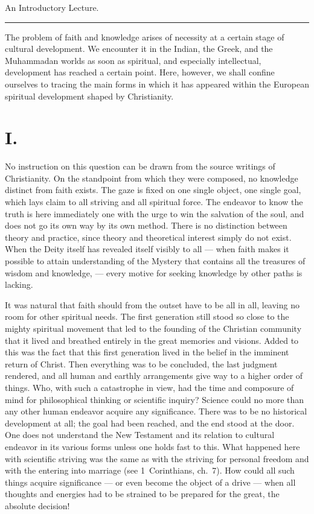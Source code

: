 \documentclass[12pt,a4paper,openany]{book}
\newcommand{\opage}[1]{\marginnote{\footnotesize\textit{[#1]}}}
\newcommand{\streg}{\begin{center}\rule{3em}{0.4pt}\end{center}}
\begin{document}
\begin{center}An Introductory Lecture.\end{center}

\streg{}

The problem of faith and knowledge arises of necessity at a
certain stage of cultural development. We encounter it in the Indian,
the Greek, and the Muhammadan worlds as soon as spiritual, and especially
intellectual, development has reached a certain point. Here, however, we
shall confine ourselves to tracing the main forms in which it has
appeared within the European spiritual development shaped by
Christianity.

\section*{I.}

No instruction on this question can be drawn from the source writings
of Christianity. On the standpoint from which they were composed, no
knowledge distinct from faith exists. The gaze is fixed on one single
object, one single goal, which lays claim to all striving and all
spiritual force. The endeavor to know the truth is here immediately one
with the urge to win the salvation of the soul, and does not go its own
way by its own method. There is no distinction between theory and
practice, since theory and theoretical interest simply do not exist.
When the Deity itself has revealed itself visibly to all --- when faith
makes it possible to attain understanding of the Mystery that contains
all the treasures of wisdom and knowledge,
\opage{196}--- every motive for seeking
knowledge by other paths is lacking.

It was natural that faith should from the outset have to be all in all,
leaving no room for other spiritual needs. The first generation still
stood so close to the mighty spiritual movement that led to the founding
of the Christian community that it lived and breathed entirely in the
great memories and visions. Added to this was the fact that this first
generation lived in the belief in the imminent return of Christ. Then
everything was to be concluded, the last judgment rendered, and all human
and earthly arrangements give way to a higher order of things. Who, with
such a catastrophe in view, had the time and composure of mind for
philosophical thinking or scientific inquiry? Science could no more than
any other human endeavor acquire any significance. There was to be no
historical development at all; the goal had been reached, and the end
stood at the door. One does not understand the New Testament and its
relation to cultural endeavor in its various forms unless one holds fast
to this. What happened here with scientific striving was the same as with
the striving for personal freedom and with the entering into marriage
(see 1~Corinthians, ch.~7). How could all such things acquire
significance --- or even become the object of a drive --- when all
thoughts and energies had to be strained to be prepared for the great,
the absolute decision!
\end{document}
